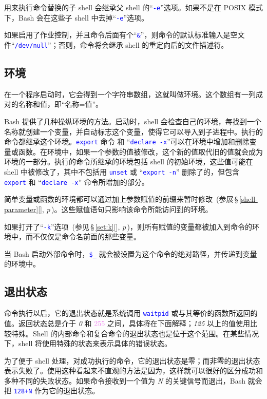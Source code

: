 \documentclass[openany,notitlepage]{book}
\newcommand{\code}[1]{\textcolor{blue}{{\tt #1}}}
\newcommand{\hl}[1]{{\sl #1}}
\newcommand{\hs}[1]{{\textcolor{violet}{#1}}}
\newcommand{\fullref}[1]{\,\S\,\ref{#1}[\nameref{#1}], \textit{p\pageref{#1}}\,}
\begin{document}
\begin{CJK}{UTF8}{song}
用来执行命令替换的子 shell 会继承父 shell 的``\code{-e}''选项。如果不是在 POSIX 模式下，Bash 会在这些子 shell 中去掉``\code{-e}''选项。

如果启用了作业控制，并且命令后面有个``\code{\&}''，则命令的默认标准输入是空文件``\code{/dev/null}''；否则，命令将会继承 shell 的重定向后的文件描述符。

\subsection{环境}\label{environment} %
在一个程序启动时，它会得到一个字符串数组，这就叫做环境。这个数组有一列成对的名称和值，即``名称=值''。

Bash 提供了几种操纵环境的方法。启动时，shell 会检查自己的环境，每找到一个名称就创建一个变量，并自动标志这个变量，使得它可以导入到子进程中。执行的命令都继承这个环境。\code{export} 命令 和 ``\code{declare -x}''可以在环境中增加和删除变量或函数。在环境中，如果一个参数的值被修改，这个新的值取代旧的值就会成为环境的一部分。执行的命令所继承的环境包括 shell 的初始环境，这些值可能在 shell 中被修改了，其中不包括用 \code{unset} 或 ``\code{export -n}'' 删除了的，但包含 \code{export} 和 ``\code{declare -x}'' 命令所增加的部分。

简单变量或函数的环境都可以通过加上参数赋值的前缀来暂时修改~(参展\fullref{shell-parameter})。这些赋值语句只影响该命令所能访问到的环境。

如果打开了``\code{-k}''选项~(参见\fullref{set:k})，则所有赋值的变量都被加入到命令的环境中，而不仅仅是命令名前面的那些变量。

当 Bash 启动外部命令时，\code{\$\_} 就会被设置为这个命令的绝对路径，并传递到变量的环境中。

\subsection{退出状态}\label{exit-status} %
命令执行以后，它的退出状态就是系统调用 \code{waitpid} 或与其等价的函数所返回的值。返回状态总是介于 \hl{0} 和 \hs{255} 之间，具体将在下面解释；\hl{125} 以上的值使用比较特殊。Shell 的内部命令和复合命令的退出状态也是位于这个范围。在某些情况下，shell 将使用特殊的状态来表示具体的错误状态。

为了便于 shell 处理，对成功执行的命令，它的退出状态是零；而非零的退出状态表示失败了。使用这种看起来不直观的方法是因为，这样就可以很好的区分成功和多种不同的失败状态。如果命令接收到一个值为 \hl{N} 的关键信号而退出，Bash 就会把 \code{128+N} 作为它的退出状态。


\end{CJK}
\end{document}
